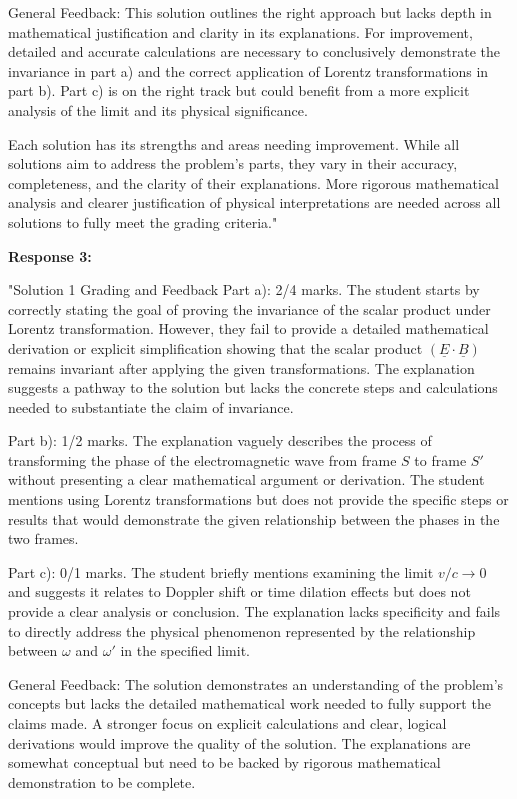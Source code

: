 \documentclass[a4paper,11pt]{article}
\begin{document}
General Feedback: This solution outlines the right approach but lacks depth in mathematical justification and clarity in its explanations. For improvement, detailed and accurate calculations are necessary to conclusively demonstrate the invariance in part a) and the correct application of Lorentz transformations in part b). Part c) is on the right track but could benefit from a more explicit analysis of the limit and its physical significance.

Each solution has its strengths and areas needing improvement. While all solutions aim to address the problem's parts, they vary in their accuracy, completeness, and the clarity of their explanations. More rigorous mathematical analysis and clearer justification of physical interpretations are needed across all solutions to fully meet the grading criteria."

\textbf{Response 3:}

"Solution 1 Grading and Feedback
Part a): 2/4 marks. The student starts by correctly stating the goal of proving the invariance of the scalar product under Lorentz transformation. However, they fail to provide a detailed mathematical derivation or explicit simplification showing that the scalar product \( (\underline{E} \cdot \underline{B}) \) remains invariant after applying the given transformations. The explanation suggests a pathway to the solution but lacks the concrete steps and calculations needed to substantiate the claim of invariance.

Part b): 1/2 marks. The explanation vaguely describes the process of transforming the phase of the electromagnetic wave from frame \( S \) to frame \( S' \) without presenting a clear mathematical argument or derivation. The student mentions using Lorentz transformations but does not provide the specific steps or results that would demonstrate the given relationship between the phases in the two frames.

Part c): 0/1 marks. The student briefly mentions examining the limit \( v/c \rightarrow 0\) and suggests it relates to Doppler shift or time dilation effects but does not provide a clear analysis or conclusion. The explanation lacks specificity and fails to directly address the physical phenomenon represented by the relationship between \( \omega \) and \( \omega' \) in the specified limit. 

General Feedback: The solution demonstrates an understanding of the problem's concepts but lacks the detailed mathematical work needed to fully support the claims made. A stronger focus on explicit calculations and clear, logical derivations would improve the quality of the solution. The explanations are somewhat conceptual but need to be backed by rigorous mathematical demonstration to be complete.
\end{document}
